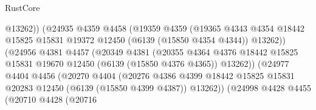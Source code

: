 \begin{lexlean}{RustCore}
\begin{coremodule}
                                        @13262))
                                    (@24935
                                      @4359
                                      @4458
                                      (@19359
                                        @4359
                                        (@19365
                                          @4343
                                          @4354
                                          @18442
                                          @15825
                                          @15831
                                          @19372
                                          @12450
                                          (@6139 (@15850 @4354 @4344))
                                          @13262))
                                      (@24956
                                        @4381
                                        @4457
                                        (@20349
                                          @4381
                                          (@20355
                                            @4364
                                            @4376
                                            @18442
                                            @15825
                                            @15831
                                            @19670
                                            @12450
                                            (@6139 (@15850 @4376 @4365))
                                            @13262))
                                        (@24977
                                          @4404
                                          @4456
                                          (@20270
                                            @4404
                                            (@20276
                                              @4386
                                              @4399
                                              @18442
                                              @15825
                                              @15831
                                              @20283
                                              @12450
                                              (@6139 (@15850 @4399 @4387))
                                              @13262))
                                          (@24998
                                            @4428
                                            @4455
                                            (@20710
                                              @4428
                                              (@20716

\end{coremodule}
\end{lexlean}
